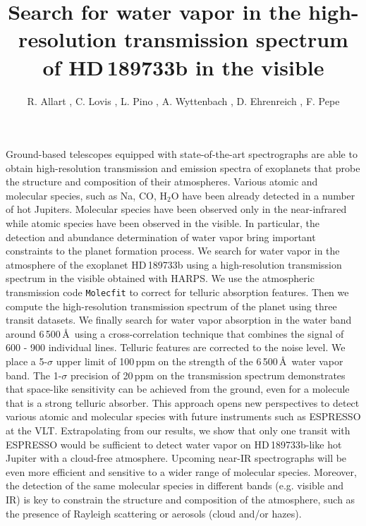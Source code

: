 \documentclass{aa}
\begin{document}
  \title{Search for water vapor in the high-resolution transmission spectrum of HD\,189733b in the visible}

   \subtitle{}

   \author{   R. Allart     , C. Lovis , L. Pino , A. Wyttenbach , D. Ehrenreich , F. Pepe 
               }



  \abstract
   {Ground-based telescopes equipped with state-of-the-art spectrographs are able to obtain high-resolution transmission and emission spectra of exoplanets that probe the structure and composition of their atmospheres. Various atomic and molecular species, such as Na, CO, H$_2$O have been already detected in a number of hot Jupiters. Molecular species have been observed only in the near-infrared while atomic species have been observed in the visible. In particular, the detection and abundance determination of water vapor bring important constraints to the planet formation process.}
   {We search for water vapor in the atmosphere of the exoplanet HD\,189733b using a high-resolution transmission spectrum in the visible obtained with HARPS. }
   {We use the atmospheric transmission code \texttt{Molecfit} to correct for telluric absorption features. Then we compute the high-resolution transmission spectrum of the planet using three transit datasets. We finally search for water vapor absorption in the water band around 6\,500\,\AA\ using a cross-correlation technique that combines the signal of 600 - 900 individual lines. }
   {Telluric features are corrected to the noise level. We place a 5-$\sigma$ upper limit of 100\,ppm on the strength of the 6\,500\,\AA\ water vapor band. The 1-$\sigma$ precision of 20\,ppm on the transmission spectrum demonstrates that space-like sensitivity can be achieved from the ground, even for a  molecule that is a strong telluric absorber.}
   {This approach opens new perspectives to detect various atomic and molecular species with future instruments such as ESPRESSO at the VLT. Extrapolating from our results, we show that only one transit with ESPRESSO would be sufficient to detect water vapor on HD\,189733b-like hot Jupiter with a cloud-free atmosphere. Upcoming near-IR spectrographs will be even more efficient and sensitive to a wider range of molecular species. Moreover, the detection of the same molecular species in different bands (e.g. visible and IR) is key to constrain the structure and composition of the atmosphere, such as the presence of Rayleigh scattering or aerosols (cloud and/or hazes).}
\end{document}
